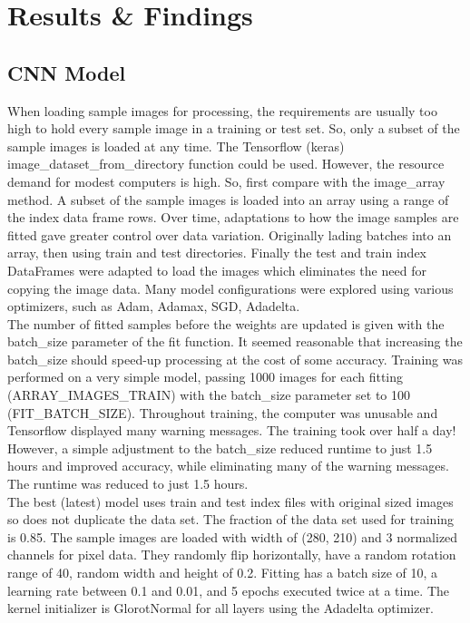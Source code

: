 \section{Results \& Findings}
\label{Results Section}

\subsection{CNN Model}

When loading sample images for processing, the requirements are usually too high to hold every sample image in a training or test set. So, only a subset of the sample images is loaded at any time. The Tensorflow (keras) image\_dataset\_from\_directory function could be used. However, the resource demand for modest computers is high. So, first compare with the image\_array method. A subset of the sample images is loaded into an array using a range of the index data frame rows. Over time, adaptations to how the image samples are fitted gave greater control over data variation. Originally lading batches into an array, then using train and test directories. Finally the test and train index  DataFrames were adapted to load the images which eliminates the need for copying the image data. Many model configurations were explored using various optimizers, such as Adam, Adamax, SGD, Adadelta. \\

The number of fitted samples before the weights are updated is given with the batch\_size parameter of the fit function. It seemed reasonable that increasing the batch\_size should speed-up processing at the cost of some accuracy. Training was performed on a very simple model, passing 1000 images for each fitting (ARRAY\_IMAGES\_TRAIN) with the batch\_size parameter set to 100 (FIT\_BATCH\_SIZE). Throughout training, the computer was unusable and Tensorflow displayed many warning messages. The training took over half a day! However, a simple adjustment to the batch\_size reduced runtime to just 1.5 hours and improved accuracy, while eliminating many of the warning messages. The runtime was reduced to just 1.5 hours. \\

The best (latest) model uses train and test index files with original sized images so does not duplicate the data set. The fraction of the data set used for training is 0.85. The sample images are loaded with width of (280, 210) and 3 normalized channels for pixel data. They randomly flip horizontally, have a random rotation range of 40, random width and height of 0.2. Fitting has a batch size of 10, a learning rate between 0.1 and 0.01, and 5 epochs executed twice at a time. The kernel initializer is GlorotNormal for all layers using the Adadelta optimizer. \\

